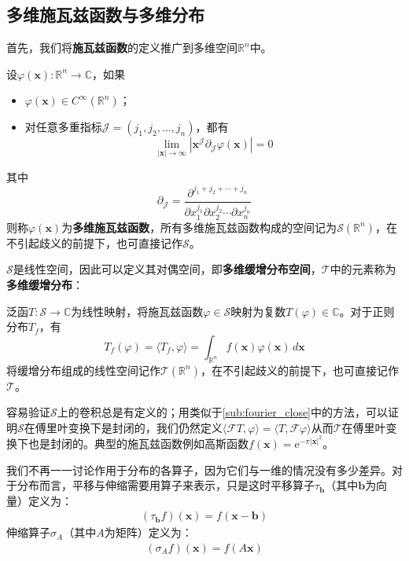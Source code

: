 \documentclass{ctexbook}
\begin{document}
\subsection{多维施瓦兹函数与多维分布}\label{sub:multi_schwartz}

首先，我们将\textbf{施瓦兹函数}的定义推广到多维空间$\mathbb{R}^n$中。
\begin{definition}[多维施瓦兹函数]
    设$\varphi(\mathbf{x}):\mathbb{R}^n\to\mathbb{C}$，如果\begin{itemize}
        \item $\varphi(\mathbf{x})\in C^{\infty}(\mathbb{R}^n)$；
        \item 对任意多重指标$\mathcal{J}=(j_1,j_2,\ldots,j_n)$，都有
        \[\lim_{|\mathbf{x}|\to\infty}|\mathbf{x}^{\mathcal{J}} \partial_{\mathcal{J}} \varphi(\mathbf{x})|=0\]
    \end{itemize}
    其中$$\partial_{\mathcal{J}}=\frac{\partial^{j_1+j_2+\cdots +j_n}}{\partial x_1^{j_1}\partial x_2^{j_2}\cdots \partial x_n^{j_n}}$$
    则称$\varphi(\mathbf{x})$为\textbf{多维施瓦兹函数}，所有多维施瓦兹函数构成的空间记为$\mathcal{S}(\mathbb{R}^n)$，在不引起歧义的前提下，也可直接记作$\mathcal{S}$。
\end{definition}

$\mathcal{S} $是线性空间，因此可以定义其对偶空间，即\textbf{多维缓增分布空间}，$\mathcal{T} $中的元素称为\textbf{多维缓增分布}：
\begin{definition}[多维缓增分布]
    泛函$T:\mathcal{S} \to \mathbb{C}$为线性映射，将施瓦兹函数$\varphi\in \mathcal{S} $映射为复数$T(\varphi)\in \mathbb{C}$。对于正则分布$T_f$，有
    $$T_f(\varphi)=\langle T_f,\varphi\rangle=\int_{\mathbb{R}^n}f(\mathbf{x})\varphi(\mathbf{x})\,d\mathbf{x}$$
    将缓增分布组成的线性空间记作$\mathcal{T} (\mathbb{R}^n)$，在不引起歧义的前提下，也可直接记作$\mathcal{T} $。
\end{definition}

容易验证$\mathcal{S} $上的卷积总是有定义的；用类似于\ref{sub:fourier_close}中的方法，可以证明$\mathcal{S} $在傅里叶变换下是封闭的，我们仍然定义$\langle \mathcal{F} T,\varphi\rangle=\langle T,\mathcal{F} \varphi\rangle$从而$\mathcal{T} $在傅里叶变换下也是封闭的。典型的施瓦兹函数例如高斯函数$f(\mathbf{x})=\mathrm{e}^{-\pi |\mathbf{x}|^2}$。

我们不再一一讨论作用于分布的各算子，因为它们与一维的情况没有多少差异。对于分布而言，平移与伸缩需要用算子来表示，只是这时平移算子$\tau_{\mathbf{b}}$（其中$\mathbf{b}$为向量）定义为：
\begin{align*}
    (\tau_{\mathbf{b}} f)(\mathbf{x})=f(\mathbf{x}-\mathbf{b})
\end{align*}
伸缩算子$\sigma_A$（其中$A$为矩阵）定义为：
\begin{align*}
    (\sigma_A f)(\mathbf{x})=f(A\mathbf{x})
\end{align*}
\end{document}
